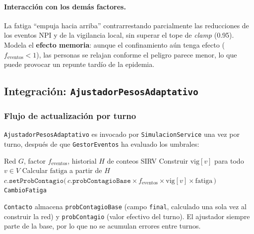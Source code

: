 \documentclass[spanish,notitlepage,letterpaper, 12pt]{article}
\begin{document}
\paragraph{Interacci\'on con los dem\'as factores.} La fatiga ``empuja hacia arriba'' contrarrestando parcialmente las reducciones de los eventos NPI y de la vigilancia local, sin superar el tope de \textit{clamp} (0.95). Modela el \textbf{efecto memoria}: aunque el confinamiento a\'un tenga efecto ($f_{\text{eventos}} < 1$), las personas se relajan conforme el peligro parece menor, lo que puede provocar un repunte tard\'io de la epidemia.

\subsection{Integraci\'on: \texttt{AjustadorPesosAdaptativo}}
\label{sec:ajustador}

\subsubsection{Flujo de actualizaci\'on por turno}

\texttt{AjustadorPesosAdaptativo} es invocado por \texttt{SimulacionService} una vez por turno, despu\'es de que \texttt{GestorEventos} ha evaluado los umbrales:

\begin{algorithm}[H]
\caption{\texttt{AjustadorPesosAdaptativo.ajustar} -- recompone todos los pesos desde la base}
\begin{algorithmic}[1]
\Require Red $G$, factor $f_{\text{eventos}}$, historial $H$ de conteos SIRV
\State Construir $\mathrm{vig}[v]$ para todo $v \in V$ 
\State Calcular $\mathrm{fatiga}$ a partir de $H$ 
    \State $c.\texttt{setProbContagio}\!\big(\,c.\texttt{probContagioBase} \times f_{\text{eventos}} \times \mathrm{vig}[v] \times \mathrm{fatiga}\,\big)$
\EndFor
\State \Return \texttt{CambioFatiga} 
\end{algorithmic}
\end{algorithm}

\texttt{Contacto} almacena \texttt{probContagioBase} (campo \texttt{final}, calculado una sola vez al construir la red) y \texttt{probContagio} (valor efectivo del turno). El ajustador siempre parte de la base, por lo que no se acumulan errores entre turnos.
\end{document}
